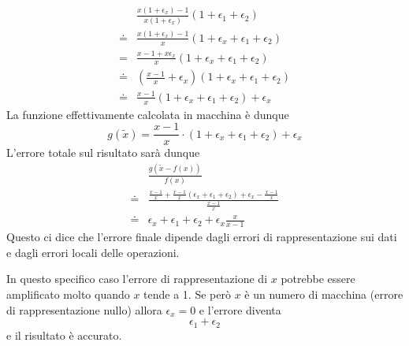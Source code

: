 \begin{example}
	\begin{align*}
		       & \frac{x (1 + \epsilon_x) - 1}{x (1 + \epsilon_x)} (1 + \epsilon_1 + \epsilon_2)        \\
		\doteq & \frac{x (1 + \epsilon_x) - 1}{x} (1 + \epsilon_x + \epsilon_1 + \epsilon_2)            \\
		=      & \frac{x - 1 + x \epsilon_x}{x} (1 + \epsilon_x + \epsilon_1 + \epsilon_2)              \\
		\doteq & \left( \frac{x - 1}{x} + \epsilon_x \right) (1 + \epsilon_x + \epsilon_1 + \epsilon_2) \\
		\doteq & \frac{x - 1}{x} (1 + \epsilon_x + \epsilon_1 + \epsilon_2) + \epsilon_x
	\end{align*}
	La funzione effettivamente calcolata in macchina è dunque
	\[ g(\tilde{x}) = \frac{x - 1}{x} \cdot (1 + \epsilon_x + \epsilon_1 + \epsilon_2) + \epsilon_x \]
	L'errore totale sul risultato sarà dunque
	\begin{align*}
		       & \frac{g(\tilde{x} - f(x))}{f(x)}                                                           \\
		\doteq & \frac{\frac{x - 1}{x} + \frac{x-1}{x}(\epsilon_x + \epsilon_1 + \epsilon_2) + \epsilon_x -
		\frac{x - 1}{x}}{\frac{x-1}{x}}                                                                     \\
		\doteq & \epsilon_x + \epsilon_1 + \epsilon_2 + \epsilon_x \frac{x}{x - 1}
	\end{align*}
	Questo ci dice che l'errore finale dipende dagli errori di rappresentazione sui dati e dagli errori locali
	delle operazioni.

	In questo specifico caso l'errore di rappresentazione di $x$ potrebbe essere amplificato molto quando $x$
	tende a 1. Se però $x$ è un numero di macchina (errore di rappresentazione nullo) allora $\epsilon_x = 0$
	e l'errore diventa
	\[ \epsilon_1 + \epsilon_2 \]
	e il risultato è accurato.
\end{example}